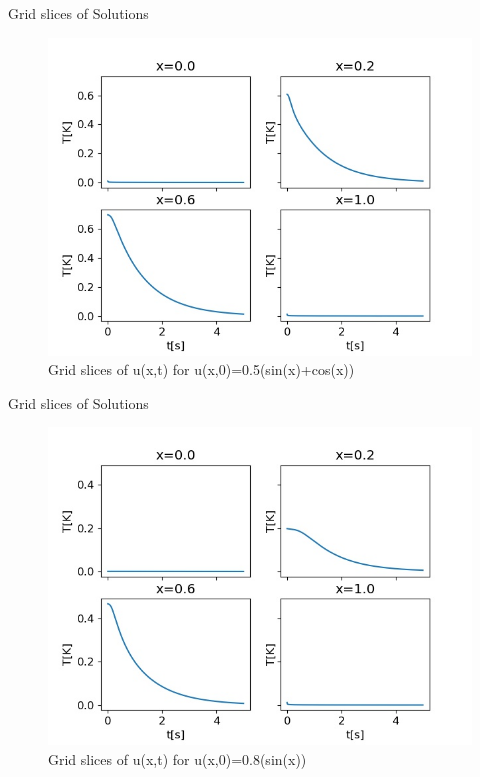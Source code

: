 \documentclass[10pt,compress]{beamer}
\begin{document}
\begin{frame}{Grid slices of Solutions}
\begin{figure}
\begin{center}
	\includegraphics[scale=0.5]{../plots/slice_2_0500_2000.jpg}
	\caption{Grid slices of u(x,t) for  u(x,0)=0.5(sin(x)+cos(x))}
	\label{fig:sin-cos-slice}
\end{center}
\end{figure}
\end{frame}

\begin{frame}{Grid slices of Solutions}
\begin{figure}
\begin{center}
	\includegraphics[scale=0.5]{../plots/slice_0_0500_2000.jpg}
	\caption{Grid slices of u(x,t) for u(x,0)=0.8(sin(x))}
	\label{fig:sin-slice}
\end{center}
\end{figure}
\end{frame}
\end{document}
